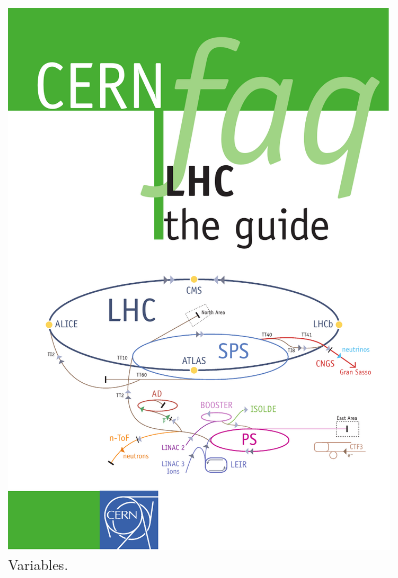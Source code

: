 \begin{figure}[tp]
  \centering
  \includegraphics[width=0.90\textwidth]{figures/lhc-atlas/lhc-accelerator-complex}
  \caption{Variables.}
  \label{fig:lhc-complex}
\end{figure}

